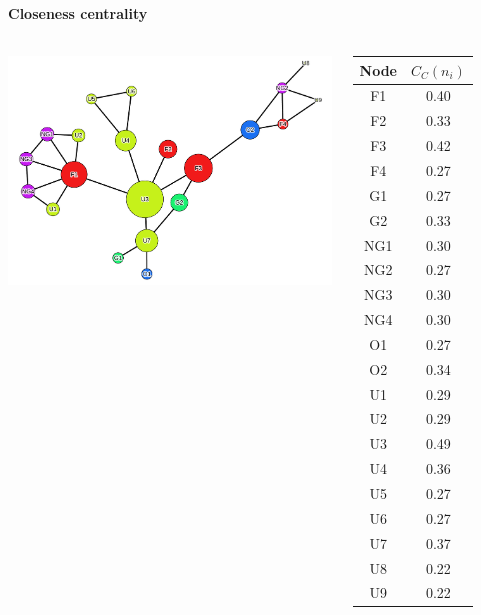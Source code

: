 \documentclass[8pt]{beamer}
\begin{document}

\begin{frame}
\frametitle{\insertsection}
\framesubtitle{Closeness centrality}

\begin{columns}[c]
    \includegraphics[width=\linewidth,height=\textheight,keepaspectratio]{exercise_closeness_gephi}

\centering
\scriptsize
\begin{table}
\centering
\begin{tabular}{cc}
\bottomrule 
Node & $C_{C}(n_{i})$ \\
\hline
F1   & 0.40       \\
F2   & 0.33      \\
F3   & 0.42      \\
F4   & 0.27      \\
G1   & 0.27      \\
G2   & 0.33      \\
NG1  & 0.30       \\
NG2  & 0.27      \\
NG3  & 0.30       \\
NG4  & 0.30       \\
O1   & 0.27      \\
O2   & 0.34      \\
U1   & 0.29      \\
U2   & 0.29      \\
U3   & 0.49      \\
U4   & 0.36      \\
U5   & 0.27      \\
U6   & 0.27      \\
U7   & 0.37      \\
U8   & 0.22      \\
U9   & 0.22    \\
\bottomrule   
\end{tabular}
\end{table}
\end{columns}
   
\end{frame}
\end{document}
